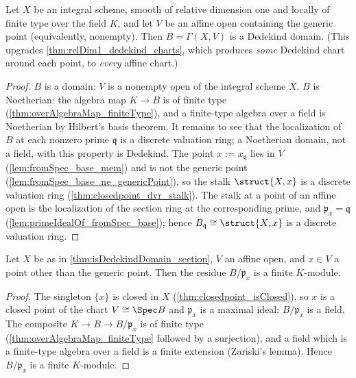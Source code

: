 \begin{theorem}
  \label{thm:isDedekindDomain_section}
  \leanok
  Let \(X\) be an integral scheme, smooth of relative dimension one and locally of
  finite type over the field \(K\), and let \(V\) be an affine open containing the
  generic point (equivalently, nonempty). Then \(B = \Gamma(X, V)\) is a Dedekind
  domain. (This upgrades \ref{thm:relDim1_dedekind_charts}, which produces \emph{some}
  Dedekind chart around each point, to \emph{every} affine chart.)
\end{theorem}
\begin{proof}
  \leanok
  \(B\) is a domain: \(V\) is a nonempty open of the integral scheme \(X\). \(B\) is
  Noetherian: the algebra map \(K \to B\) is of finite type
  (\ref{thm:overAlgebraMap_finiteType}), and a finite-type algebra over a field is
  Noetherian by Hilbert's basis theorem. It remains to see that the localization of
  \(B\) at each nonzero prime \(\mathfrak q\) is a discrete valuation ring; a
  Noetherian domain, not a field, with this property is Dedekind. The point
  \(x := x_{\mathfrak q}\) lies in \(V\) (\ref{lem:fromSpec_base_mem}) and is not the
  generic point (\ref{lem:fromSpec_base_ne_genericPoint}), so the stalk
  \(\struct{X,x}\) is a discrete valuation ring (\ref{thm:closedpoint_dvr_stalk}).
  The stalk at a point of an affine open is the localization of the section ring at
  the corresponding prime, and \(\mathfrak p_x = \mathfrak q\)
  (\ref{lem:primeIdealOf_fromSpec_base}); hence \(B_{\mathfrak q} \cong
  \struct{X,x}\) is a discrete valuation ring.
\end{proof}

\begin{theorem}
  \label{thm:moduleFinite_quotient_primeIdealOf}
  \leanok
  Let \(X\) be as in \ref{thm:isDedekindDomain_section}, \(V\) an affine open, and
  \(x \in V\) a point other than the generic point. Then the residue
  \(B/\mathfrak p_x\) is a finite \(K\)-module.
\end{theorem}
\begin{proof}
  \leanok
  The singleton \(\{x\}\) is closed in \(X\) (\ref{thm:closedpoint_isClosed}), so
  \(x\) is a closed point of the chart \(V \cong \Spec B\) and \(\mathfrak p_x\) is a
  maximal ideal; \(B/\mathfrak p_x\) is a field. The composite
  \(K \to B \to B/\mathfrak p_x\) is of finite type
  (\ref{thm:overAlgebraMap_finiteType} followed by a surjection), and a field which is
  a finite-type algebra over a field is a finite extension (Zariski's lemma). Hence
  \(B/\mathfrak p_x\) is a finite \(K\)-module.
\end{proof}

